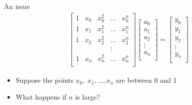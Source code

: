 \documentclass[10pt]{beamer}
\begin{document}
\begin{frame}{An issue}
  \begin{align*}
    \begin{bmatrix}
      1 & x_0 & x_0^2 & \dots & x_0^{n}\\
      1 & x_1 & x_1^2 & \dots & x_1^{n}\\
      1 & x_2 & x_2^2 & \dots & x_2^{n}\\
        &     &       & \vdots&      \\
      1 & x_n & x_n^2 & \dots & x_n^{n}\\
    \end{bmatrix}
    \begin{bmatrix}
      a_0\\
      a_1\\
      a_2\\
      \vdots\\
      a_n\\
    \end{bmatrix}
     =
    \begin{bmatrix}
      y_0\\
      y_1\\
      y_2\\
      \vdots\\
      y_n\\
    \end{bmatrix}
  \end{align*}
  \begin{itemize}
      \item Suppose the points $x_0,\; x_1, \ldots, x_n $ are between 0 and 1
      \item What happens if $n$ is large?
  \end{itemize}
\end{frame}
\end{document}
